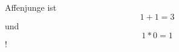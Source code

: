 \documentclass[a4paper,12pt]{article}
\begin{document}
Affenjunge ist
\begin{equation}
	1+1=3
\end{equation}
und 
\begin{equation}
	1*0=1
\end{equation}
!
\end{document}
